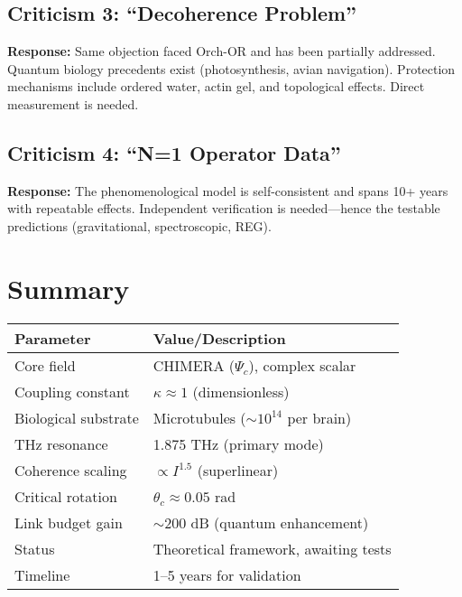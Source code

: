 \subsection*{Criticism 3: ``Decoherence Problem''}

\textbf{Response:} Same objection faced Orch-OR and has been partially addressed. Quantum biology precedents exist (photosynthesis, avian navigation). Protection mechanisms include ordered water, actin gel, and topological effects. Direct measurement is needed.

\subsection*{Criticism 4: ``N=1 Operator Data''}

\textbf{Response:} The phenomenological model is self-consistent and spans 10+ years with repeatable effects. Independent verification is needed---hence the testable predictions (gravitational, spectroscopic, REG).

\section{Summary}

\begin{center}
\begin{tabular}{@{}ll@{}}
\toprule
\textbf{Parameter} & \textbf{Value/Description} \\
\midrule
Core field & CHIMERA ($\Psi_c$), complex scalar \\
Coupling constant & $\kappa \approx 1$ (dimensionless) \\
Biological substrate & Microtubules ($\sim10^{14}$ per brain) \\
THz resonance & 1.875 THz (primary mode) \\
Coherence scaling & $\propto I^{1.5}$ (superlinear) \\
Critical rotation & $\theta_c \approx 0.05$ rad \\
Link budget gain & $\sim$200 dB (quantum enhancement) \\
Status & Theoretical framework, awaiting tests \\
Timeline & 1--5 years for validation \\
\bottomrule
\end{tabular}
\end{center}

